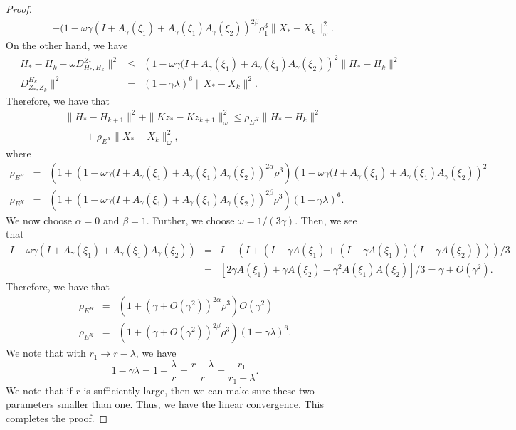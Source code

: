 \begin{itemize}
\begin{proof}
\begin{eqnarray*}
&& + (1 - \omega \gamma (I +  A_\gamma(\xi_1) + A_\gamma (\xi_1)A_\gamma(\xi_2))^{2\beta} \rho_1^3 \|X_* - X_k\|_\omega^2. 
\end{eqnarray*}
On the other hand, we have 
\begin{eqnarray*}
\|H_* - H_k - \omega D_{H_*,H_k}^{Z_*} \|^2 &\leq& 
\left (1 - \omega \gamma (I +  A_\gamma(\xi_1) + A_\gamma (\xi_1)A_\gamma(\xi_2) \right )^{2} \|H_* - H_k\|^2 \\ 
\|D_{Z_*,Z_k}^{H_k}\|^2 &=& (1 - \gamma \lambda)^6 \|X_* - X_k\|^2.   
\end{eqnarray*}
Therefore, we have that 
\begin{eqnarray*}
&& \|H_{*} - H_{k+1}\|^2 + \|Kz_* - Kz_{k+1}\|^2_{\omega} \leq \rho_{E^H} \|H_* - H_k\|^2  \\
&& \qquad + \rho_{E^X} \|X_* - X_k\|_{\omega}^2, 
\end{eqnarray*}
where 
\begin{eqnarray*}
\rho_{E^H} &=& \left ( 1 + \left ( 1 - \omega \gamma (I +  A_\gamma(\xi_1) + A_\gamma (\xi_1)A_\gamma(\xi_2) \right )^{2\alpha} \rho^3 \right ) \left ( 1 - \omega \gamma (I +  A_\gamma(\xi_1) + A_\gamma (\xi_1)A_\gamma(\xi_2) \right )^{2} \\
\rho_{E^X} &=& \left ( 1 + \left ( 1 - \omega \gamma (I +  A_\gamma(\xi_1) + A_\gamma (\xi_1)A_\gamma(\xi_2) \right )^{2\beta} \rho^3 \right ) (1 - \gamma \lambda)^6. 
\end{eqnarray*}
We now choose $\alpha = 0$ and $\beta = 1$. Further, we choose $\omega = 1/(3\gamma)$. Then, we see that 
\begin{eqnarray*}
I - \omega \gamma (I + A_\gamma(\xi_1) + A_\gamma (\xi_1) A_\gamma(\xi_2)) &=& I - (I + (I - \gamma A(\xi_1) + (I - \gamma A(\xi_1))(I - \gamma A(\xi_2))))/3  \\
&=& [2\gamma A(\xi_1) + \gamma A(\xi_2) - \gamma^2 A(\xi_1) A(\xi_2)]/3 = \gamma + O(\gamma^2). 
\end{eqnarray*}
Therefore, we have that 
\begin{eqnarray*}
\rho_{E^H} &=& \left ( 1 + (\gamma + O(\gamma^2))^{2\alpha} \rho^3 \right )  O(\gamma^2) \\
\rho_{E^X} &=& \left ( 1 + (\gamma + O(\gamma^2))^{2\beta} \rho^3 \right ) (1 - \gamma \lambda)^6. 
\end{eqnarray*}
We note that with $r_1 \rightarrow r - \lambda$, we have 
\begin{equation} 
1 - \gamma \lambda = 1 - \frac{\lambda}{r} = \frac{r - \lambda}{r} = \frac{r_1}{r_1 + \lambda}. 
\end{equation} 
We note that if $r$ is sufficiently large, then we can make sure these two parameters smaller than one. Thus, we have the linear convergence.  This completes the proof. 
\end{proof}



\end{itemize}
